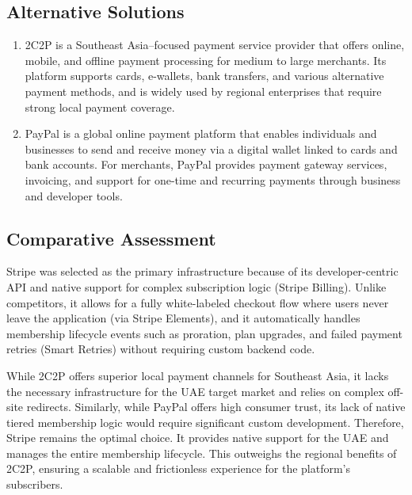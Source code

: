 \subsection{Alternative Solutions}
\begin{enumerate}
  \item 2C2P \cite{2c2p2025docs} is a Southeast Asia–focused payment service provider that offers online, mobile, and offline payment processing for medium to large merchants. Its platform supports cards, e-wallets, bank transfers, and various alternative payment methods, and is widely used by regional enterprises that require strong local payment coverage.
  \item PayPal \cite{tipalti2025paypal} is a global online payment platform that enables individuals and businesses to send and receive money via a digital wallet linked to cards and bank accounts. For merchants, PayPal provides payment gateway services, invoicing, and support for one-time and recurring payments through business and developer tools.
\end{enumerate}
\subsection{Comparative Assessment}
Stripe was selected as the primary infrastructure because of its developer-centric API and native support for complex subscription logic (Stripe Billing). Unlike competitors, it allows for a fully white-labeled checkout flow where users never leave the application (via Stripe Elements), and it automatically handles membership lifecycle events such as proration, plan upgrades, and failed payment retries (Smart Retries) without requiring custom backend code.

While 2C2P offers superior local payment channels for Southeast Asia, it lacks the necessary infrastructure for the UAE target market and relies on complex off-site redirects. Similarly, while PayPal offers high consumer trust, its lack of native tiered membership logic would require significant custom development.
Therefore, Stripe remains the optimal choice. It provides native support for the UAE and manages the entire membership lifecycle. This outweighs the regional benefits of 2C2P, ensuring a scalable and frictionless experience for the platform's subscribers.
